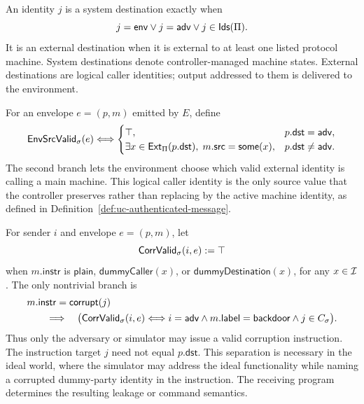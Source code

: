 \begin{definition}
\label{def:uc-route-targets}
\leanok
An identity \(j\) is a system destination exactly when
\[
  j=\mathsf{env}\lor j=\mathsf{adv}\lor j\in\mathsf{Ids}(\Pi).
\]
It is an external destination when it is external to at least one listed
protocol machine.  System destinations denote controller-managed machine
states.  External destinations are logical caller identities; output addressed
to them is delivered to the environment.
\end{definition}

\begin{definition}
\label{def:uc-environment-source}
\leanok
For an envelope \(e=(p,m)\) emitted by \(E\), define
\[
  \mathsf{EnvSrcValid}_\sigma(e)
  \Longleftrightarrow
  \begin{cases}
    \top,
      &p.\mathsf{dst}=\mathsf{adv},\\
    \exists x\in\mathsf{Ext}_\Pi(p.\mathsf{dst}),\;
      m.\mathsf{src}=\mathsf{some}(x),
      &p.\mathsf{dst}\ne\mathsf{adv}.
  \end{cases}
\]
The second branch lets the environment choose which valid external identity is
calling a main machine.  This logical caller identity is the only source value
that the controller preserves rather than replacing by the active machine
identity, as defined in Definition~\ref{def:uc-authenticated-message}.
\end{definition}

\begin{definition}
\label{def:uc-corruption-validity}
\leanok
For sender \(i\) and envelope \(e=(p,m)\), let
\[
  \mathsf{CorrValid}_\sigma(i,e):=\top
\]
when \(m.\mathsf{instr}\) is \(\mathsf{plain}\),
\(\mathsf{dummyCaller}(x)\), or \(\mathsf{dummyDestination}(x)\), for any
\(x\in\mathcal{I}\).  The only nontrivial branch is
\[
\begin{aligned}
  &m.\mathsf{instr}=\mathsf{corrupt}(j)\\
  &\qquad\Longrightarrow\quad
  \bigl(\mathsf{CorrValid}_\sigma(i,e)
  \Longleftrightarrow
  i=\mathsf{adv}\land m.\mathsf{label}=\mathsf{backdoor}
  \land j\in C_\sigma\bigr).
\end{aligned}
\]
Thus only the adversary or simulator may issue a valid corruption instruction.
The instruction target \(j\) need not equal \(p.\mathsf{dst}\).  This separation
is necessary in the ideal world, where the simulator may address the ideal
functionality while naming a corrupted dummy-party identity in the instruction.
The receiving program determines the resulting leakage or command semantics.
\end{definition}


